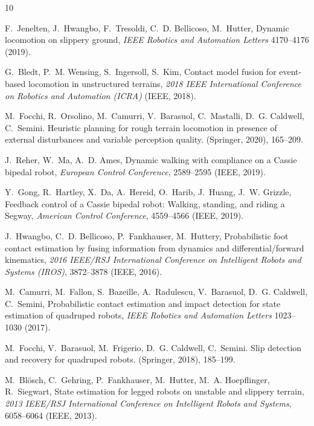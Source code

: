 \documentclass[9pt,twocolumn,twoside]{osajnl}
\begin{document}
\begin{thebibliography}{10}

F.~Jenelten, J.~Hwangbo, F.~Tresoldi, C.~D. Bellicoso, M.~Hutter, Dynamic
  locomotion on slippery ground, {\it IEEE Robotics and Automation Letters\/}
  4170--4176 (2019).

G.~Bledt, P.~M. Wensing, S.~Ingersoll, S.~Kim, Contact model fusion for
  event-based locomotion in unstructured terrains, {\it 2018 IEEE International
  Conference on Robotics and Automation (ICRA)\/} (IEEE, 2018).

M.~Focchi, R.~Orsolino, M.~Camurri, V.~Barasuol, C.~Mastalli, D.~G. Caldwell,
  C.~Semini.
\newblock Heuristic planning for rough terrain locomotion in presence of
  external disturbances and variable perception quality.
 (Springer,
  2020),  165--209.

J.~Reher, W.~Ma, A.~D. Ames, Dynamic walking with compliance on a {Cassie}
  bipedal robot, {\it European Control Conference\/},  2589--2595 ({IEEE},
  2019).

Y.~Gong, R.~Hartley, X.~Da, A.~Hereid, O.~Harib, J.~Huang, J.~W. Grizzle,
  Feedback control of a {Cassie} bipedal robot: Walking, standing, and riding a
  {Segway}, {\it American Control Conference\/},  4559--4566 (IEEE, 2019).

J.~Hwangbo, C.~D. Bellicoso, P.~Fankhauser, M.~Huttery, Probabilistic foot
  contact estimation by fusing information from dynamics and
  differential/forward kinematics, {\it 2016 IEEE/RSJ International Conference
  on Intelligent Robots and Systems (IROS)\/},  3872--3878 (IEEE, 2016).

M.~Camurri, M.~Fallon, S.~Bazeille, A.~Radulescu, V.~Barasuol, D.~G. Caldwell,
  C.~Semini, Probabilistic contact estimation and impact detection for state
  estimation of quadruped robots, {\it IEEE Robotics and Automation Letters\/}
  1023--1030 (2017).

M.~Focchi, V.~Barasuol, M.~Frigerio, D.~G. Caldwell, C.~Semini.
\newblock Slip detection and recovery for quadruped robots.
 (Springer, 2018),  185--199.

M.~Bl{\"{o}}sch, C.~Gehring, P.~Fankhauser, M.~Hutter, M.~A. Hoepflinger,
  R.~Siegwart, State estimation for legged robots on unstable and slippery
  terrain, {\it 2013 {IEEE/RSJ} International Conference on Intelligent Robots
  and Systems\/},  6058--6064 ({IEEE}, 2013).


\end{thebibliography}
\end{document}
